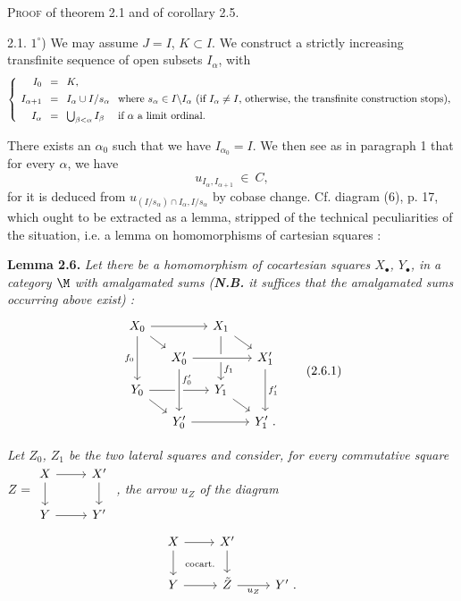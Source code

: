 

\textsc{Proof} of theorem 2.1 and of corollary 2.5.

2.1. $1^\circ$) We may assume $J = I$, $K \subset I$. We construct a strictly increasing transfinite sequence of open subsets $I_\alpha$, with
\[
\left\{
\setlength{\arraycolsep}{4pt}
\begin{array}{rcll}
I_0 & = & K, & \\[1ex]
I_{\alpha+1} & = & I_\alpha \cup I/s_\alpha & \text{where } s_\alpha \in I\backslash I_\alpha \text{ (if } I_\alpha \neq I\text{, otherwise, the transfinite construction stops),}\\[1ex]
I_\alpha & = & \bigcup_{\beta<\alpha} I_\beta & \text{if } \alpha \text{ a limit ordinal.}
\end{array}
\right.
\]

There exists an $\alpha_0$ such that we have $I_{\alpha_0} = I$. We then see as in paragraph 1
that for every $\alpha$, we have
\[
u_{I_\alpha,I_{\alpha+1}} \ \in\ C,
\tag*{$(*)$}
\]
for it is deduced from $u_{(I/s_\alpha)\cap I_\alpha,I/s_\alpha}$ by cobase change. Cf. diagram (6), p. 17, which ought to be extracted as a lemma, stripped of the technical peculiarities of the situation, i.e. a lemma on homomorphisms of cartesian squares :

\textbf{Lemma 2.6.} \textit{Let there be a homomorphism of cocartesian squares $X_\bullet$, $Y_\bullet$, in a category $\M$ with amalgamated sums (\textbf{N.B.} it suffices that the amalgamated sums occurring above exist) :}
\[
\begin{tikzcd}[row sep=small, column sep=small]
X_0 \arrow[rr] \arrow[dr] \arrow[dd, "f_0"'] & & X_1 \arrow[dr] \arrow[dd, "f_1" near end] & \\
 & X'_0 \arrow[rr, crossing over] & & X'_1 \arrow[dd, "f'_1"] \\
Y_0 \arrow[rr] \arrow[dr] & & Y_1 \arrow[dr] & \\
 & Y'_0 \arrow[rr] \arrow[from=uu, crossing over, "f'_0" near start] & & Y'_1 \ .
\end{tikzcd}
\tag*{(2.6.1)}
\]

\textit{Let $Z_0$, $Z_1$ be the two lateral squares and consider, for every commutative square}
$Z = \begin{tikzcd}[ampersand replacement=\&, baseline=(\tikzcdmatrixname.center)]
X \arrow[r] \arrow[d] \& X' \arrow[d] \\
Y \arrow[r] \& Y'
\end{tikzcd}$ \textit{, the arrow $u_Z$ of the diagram}
\[
\begin{tikzcd}
X \arrow[r] \arrow[d] \arrow[dr, phantom, "\text{\scriptsize cocart.}"] & X' \arrow[d] & \\
Y \arrow[r] & \tilde{Z} \arrow[r, "u_Z"'] & Y' \ .
\end{tikzcd}
\]

